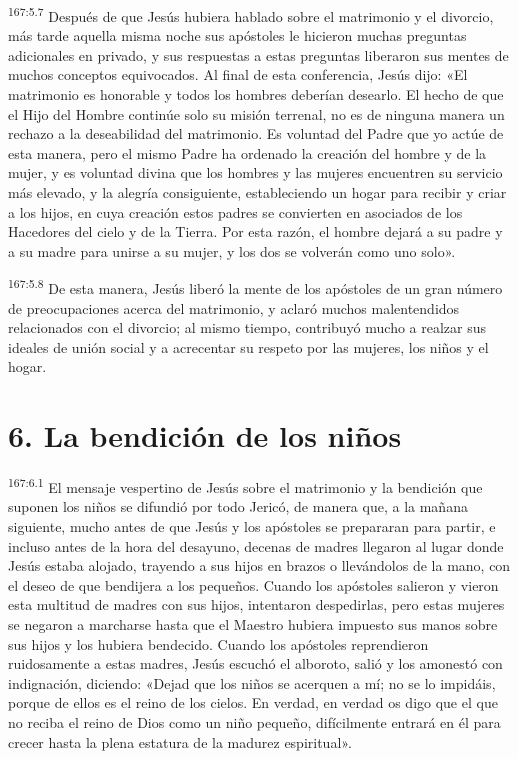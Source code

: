 \par 
\textsuperscript{167:5.7} Después de que Jesús hubiera hablado sobre el matrimonio y el divorcio, más tarde aquella misma noche sus apóstoles le hicieron muchas preguntas adicionales en privado, y sus respuestas a estas preguntas liberaron sus mentes de muchos conceptos equivocados. Al final de esta conferencia, Jesús dijo: «El matrimonio es honorable y todos los hombres deberían desearlo. El hecho de que el Hijo del Hombre continúe solo su misión terrenal, no es de ninguna manera un rechazo a la deseabilidad del matrimonio. Es voluntad del Padre que yo actúe de esta manera, pero el mismo Padre ha ordenado la creación del hombre y de la mujer, y es voluntad divina que los hombres y las mujeres encuentren su servicio más elevado, y la alegría consiguiente, estableciendo un hogar para recibir y criar a los hijos, en cuya creación estos padres se convierten en asociados de los Hacedores del cielo y de la Tierra. Por esta razón, el hombre dejará a su padre y a su madre para unirse a su mujer, y los dos se volverán como uno solo».

\par 
\textsuperscript{167:5.8} De esta manera, Jesús liberó la mente de los apóstoles de un gran número de preocupaciones acerca del matrimonio, y aclaró muchos malentendidos relacionados con el divorcio; al mismo tiempo, contribuyó mucho a realzar sus ideales de unión social y a acrecentar su respeto por las mujeres, los niños y el hogar.

\section*{6. La bendición de los niños}
\par 
\textsuperscript{167:6.1} El mensaje vespertino de Jesús sobre el matrimonio y la bendición que suponen los niños se difundió por todo Jericó, de manera que, a la mañana siguiente, mucho antes de que Jesús y los apóstoles se prepararan para partir, e incluso antes de la hora del desayuno, decenas de madres llegaron al lugar donde Jesús estaba alojado, trayendo a sus hijos en brazos o llevándolos de la mano, con el deseo de que bendijera a los pequeños. Cuando los apóstoles salieron y vieron esta multitud de madres con sus hijos, intentaron despedirlas, pero estas mujeres se negaron a marcharse hasta que el Maestro hubiera impuesto sus manos sobre sus hijos y los hubiera bendecido. Cuando los apóstoles reprendieron ruidosamente a estas madres, Jesús escuchó el alboroto, salió y los amonestó con indignación, diciendo: «Dejad que los niños se acerquen a mí; no se lo impidáis, porque de ellos es el reino de los cielos. En verdad, en verdad os digo que el que no reciba el reino de Dios como un niño pequeño, difícilmente entrará en él para crecer hasta la plena estatura de la madurez espiritual».

